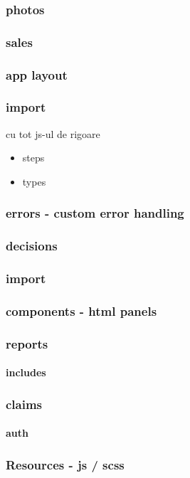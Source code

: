 	\subsubsection{photos}
	\subsubsection{sales}
	\subsubsection{app layout}
	\subsubsection{import}
		cu tot js-ul de rigoare
		\begin{itemize}
			\item steps
			\item types
		\end{itemize}
	\subsubsection{errors - custom error handling}
	\subsubsection{decisions}
	\subsubsection{import}
	\subsubsection{components - html panels}
	\subsubsection{reports}
		\paragraph{includes}
	\subsubsection{claims}
		\paragraph{auth}
	\subsubsection{Resources - js / scss}
